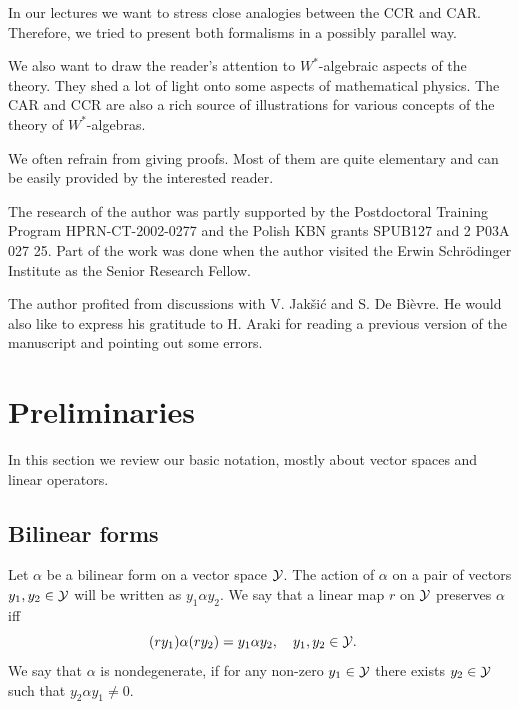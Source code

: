 \documentclass{svmult}
\def\cY{{\cal Y}}
\begin{document}
In our lectures
we want to stress
 close analogies
between the CCR and CAR. Therefore, we tried
to present both formalisms in a possibly parallel way.


 We also
want to draw the  reader's attention to 
  $W^*$-algebraic aspects of the theory.
 They
shed a lot of light onto some aspects of
mathematical physics. 
The CAR and CCR are also
 a rich source of illustrations for various concepts of
the  theory of $W^*$-algebras.  


We often refrain from giving proofs. Most of them are quite elementary and
can be easily provided by
the interested reader.


\medskip

The research of the author  was  partly supported by the
Postdoctoral Training Program HPRN-CT-2002-0277 and the Polish KBN grants
 SPUB127 and 2 P03A 027 25. Part of the work was done  when the author
 visited the
 Erwin Schr\"odinger Institute as the Senior Research Fellow.

The author profited from
 discussions with V. Jak\v{s}i\'{c} and S. De Bi\`{e}vre. He would also like
 to express his gratitude to H. Araki for reading a previous version of the
 manuscript and pointing out some  errors.





\section{Preliminaries}
\label{2}

In this section we review our basic notation, mostly about vector spaces and
linear operators.


\subsection{Bilinear forms}



Let $\alpha$ be a bilinear  form on a vector space $\cY$.
The action of $\alpha$  on
 a pair of vectors $y_1,y_2\in\cY$ will be written 
as
$y_1\alpha y_2$. 
We say that a linear map $r$ on $\cY$  preserves $\alpha$ iff
\[(ry_1)\alpha(ry_2)=y_1\alpha y_2,\ \ \ y_1,y_2\in\cY.\ \ \ \]
We say that $\alpha$ is nondegenerate,
 if
for any non-zero 
$y_1\in \cY$ there exists $y_2\in\cY$ such that $y_2\alpha y_1\neq0$.
\end{document}
